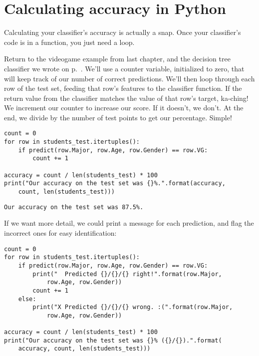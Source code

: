 \section{Calculating accuracy in Python}

Calculating your classifier's accuracy is actually a snap. Once your
classifier's code is in a function, you just need a loop.

Return to the videogame example from last chapter, and the decision tree
classifier we wrote on p.~\pageref{fig:completeVgTreePython}. We'll use a
counter variable, initialized to zero, that will keep track of our number of
correct predictions. We'll then loop through each row of the test set, feeding
that row's features to the classifier function. If the return value from the
classifier matches the value of that row's target, ka-ching! We increment our
counter to increase our score. If it doesn't, we don't. At the end, we divide
by the number of test points to get our percentage. Simple!

\begin{Verbatim}[fontsize=\footnotesize,samepage=true,frame=single,framesep=3mm]
count = 0
for row in students_test.itertuples():
    if predict(row.Major, row.Age, row.Gender) == row.VG:
        count += 1

accuracy = count / len(students_test) * 100
print("Our accuracy on the test set was {}%.".format(accuracy,
    count, len(students_test)))
\end{Verbatim}
\vspace{-.3in}

\begin{Verbatim}[fontsize=\small,samepage=true,frame=leftline,framesep=5mm,framerule=1mm]
Our accuracy on the test set was 87.5%.
\end{Verbatim}

\smallskip

If we want more detail, we could print a message for each prediction, and flag
the incorrect ones for easy identification:

\begin{Verbatim}[fontsize=\footnotesize,samepage=true,frame=single,framesep=3mm]
count = 0
for row in students_test.itertuples():
    if predict(row.Major, row.Age, row.Gender) == row.VG:
        print("  Predicted {}/{}/{} right!".format(row.Major,
            row.Age, row.Gender))
        count += 1
    else:
        print("X Predicted {}/{}/{} wrong. :(".format(row.Major,
            row.Age, row.Gender))

accuracy = count / len(students_test) * 100
print("Our accuracy on the test set was {}% ({}/{}).".format(
    accuracy, count, len(students_test)))
\end{Verbatim}
\vspace{-.3in}

